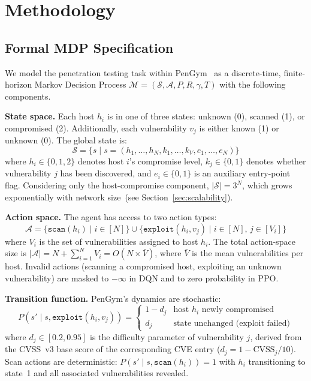 \documentclass[conference]{IEEEtran}
\begin{document}
\section{Methodology}
\label{sec:method}

\subsection{Formal MDP Specification}
\label{sec:mdp}

We model the penetration testing task within PenGym~\cite{nguyen2025cose} as a discrete-time, finite-horizon
Markov Decision Process $\mathcal{M} = (\mathcal{S}, \mathcal{A}, P, R, \gamma, T)$
with the following components.

\textbf{State space.}  Each host $h_i$ is in one of three states:
unknown (0), scanned (1), or compromised (2).  Additionally, each
vulnerability $v_j$ is either known (1) or unknown (0).  The global
state is:
\begin{equation}
  \mathcal{S} = \bigl\{s \;\big|\; s = (h_1, \ldots, h_N, k_1, \ldots, k_V,
  e_1, \ldots, e_N)\bigr\}
  \label{eq:statespace}
\end{equation}
where $h_i \in \{0, 1, 2\}$ denotes host $i$'s compromise level,
$k_j \in \{0, 1\}$ denotes whether vulnerability $j$ has been
discovered, and $e_i \in \{0, 1\}$ is an auxiliary entry-point flag.
Considering only the host-compromise component, $|\mathcal{S}| = 3^N$,
which grows exponentially with network size~(see Section~\ref{sec:scalability}).

\textbf{Action space.}  The agent has access to two action types:
\begin{equation}
  \mathcal{A} = \bigl\{\texttt{scan}(h_i) \;\big|\; i \in [N]\bigr\}
  \cup \bigl\{\texttt{exploit}(h_i, v_j) \;\big|\; i \in [N],\, j \in [V_i]\bigr\}
  \label{eq:actionspace}
\end{equation}
where $V_i$ is the set of vulnerabilities assigned to host $h_i$.
The total action-space size is $|\mathcal{A}| = N + \sum_{i=1}^N V_i =
O(N \times \bar{V})$, where $\bar{V}$ is the mean vulnerabilities
per host.  Invalid actions (scanning a compromised host, exploiting
an unknown vulnerability) are masked to $-\infty$ in DQN and to zero
probability in PPO.

\textbf{Transition function.}  PenGym's dynamics are stochastic:
\begin{equation}
  P(s' \mid s, \texttt{exploit}(h_i, v_j)) =
  \begin{cases}
    1 - d_j & \text{host } h_i \text{ newly compromised}\\
    d_j & \text{state unchanged (exploit failed)}
  \end{cases}
  \label{eq:transition}
\end{equation}
where $d_j \in [0.2, 0.95]$ is the difficulty parameter of
vulnerability $j$, derived from the CVSS~v3 base score of the
corresponding CVE entry ($d_j = 1 - \text{CVSS}_j/10$).  Scan actions are deterministic: $P(s' \mid s,
\texttt{scan}(h_i)) = 1$ with $h_i$ transitioning to state~1 and
all associated vulnerabilities revealed.
\end{document}
